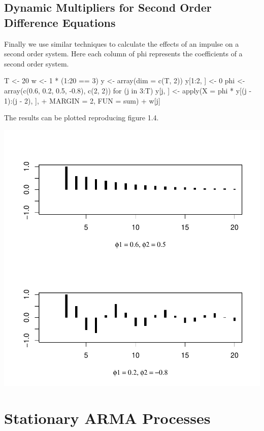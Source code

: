 \documentclass[a4paper]{article}
\renewcommand{\~}{\perispomeni}%
\begin{document}
\subsection{Dynamic Multipliers for Second Order Difference Equations}
Finally we use similar techniques to calculate the effects of an impulse on a second order system.
Here each column of phi represents the coefficients of a second order system.
\begin{Schunk}
\begin{Sinput}
 T <- 20
 w <- 1 * (1:20 == 3)
 y <- array(dim = c(T, 2))
 y[1:2, ] <- 0
 phi <- array(c(0.6, 0.2, 0.5, -0.8), c(2, 2))
 for (j in 3:T) y[j, ] <- apply(X = phi * y[(j - 1):(j - 2), ], 
+     MARGIN = 2, FUN = sum) + w[j]
\end{Sinput}
\end{Schunk}
The results can be plotted reproducing figure 1.4.
\begin{center}
\includegraphics{Companion-012}
\end{center}
\section{Stationary ARMA Processes}
\end{document}
